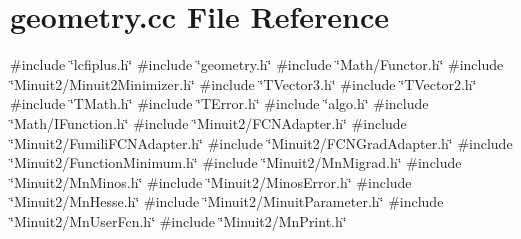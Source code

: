 \section{geometry.\+cc File Reference}
\label{geometry_8cc}
{\ttfamily \#include \char`\"{}lcfiplus.\+h\char`\"{}}\newline
{\ttfamily \#include \char`\"{}geometry.\+h\char`\"{}}\newline
{\ttfamily \#include \char`\"{}Math/\+Functor.\+h\char`\"{}}\newline
{\ttfamily \#include \char`\"{}Minuit2/\+Minuit2\+Minimizer.\+h\char`\"{}}\newline
{\ttfamily \#include \char`\"{}T\+Vector3.\+h\char`\"{}}\newline
{\ttfamily \#include \char`\"{}T\+Vector2.\+h\char`\"{}}\newline
{\ttfamily \#include \char`\"{}T\+Math.\+h\char`\"{}}\newline
{\ttfamily \#include \char`\"{}T\+Error.\+h\char`\"{}}\newline
{\ttfamily \#include \char`\"{}algo.\+h\char`\"{}}\newline
{\ttfamily \#include \char`\"{}Math/\+I\+Function.\+h\char`\"{}}\newline
{\ttfamily \#include \char`\"{}Minuit2/\+F\+C\+N\+Adapter.\+h\char`\"{}}\newline
{\ttfamily \#include \char`\"{}Minuit2/\+Fumili\+F\+C\+N\+Adapter.\+h\char`\"{}}\newline
{\ttfamily \#include \char`\"{}Minuit2/\+F\+C\+N\+Grad\+Adapter.\+h\char`\"{}}\newline
{\ttfamily \#include \char`\"{}Minuit2/\+Function\+Minimum.\+h\char`\"{}}\newline
{\ttfamily \#include \char`\"{}Minuit2/\+Mn\+Migrad.\+h\char`\"{}}\newline
{\ttfamily \#include \char`\"{}Minuit2/\+Mn\+Minos.\+h\char`\"{}}\newline
{\ttfamily \#include \char`\"{}Minuit2/\+Minos\+Error.\+h\char`\"{}}\newline
{\ttfamily \#include \char`\"{}Minuit2/\+Mn\+Hesse.\+h\char`\"{}}\newline
{\ttfamily \#include \char`\"{}Minuit2/\+Minuit\+Parameter.\+h\char`\"{}}\newline
{\ttfamily \#include \char`\"{}Minuit2/\+Mn\+User\+Fcn.\+h\char`\"{}}\newline
{\ttfamily \#include \char`\"{}Minuit2/\+Mn\+Print.\+h\char`\"{}}\newline
